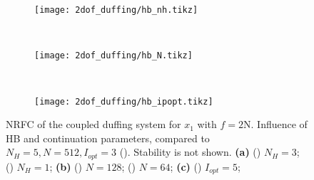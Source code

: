 \begin{figure}[ht!]
  \centering
  \begin{subfigure}[b]{0.7\textwidth}
    \texttt{[image: 2dof\_duffing/hb\_nh.tikz]}
    \caption{}
    \label{fig:hb_frf_a_appendix}
  \end{subfigure}\\
  \begin{subfigure}[b]{0.45\textwidth}
    \texttt{[image: 2dof\_duffing/hb\_N.tikz]}
    \caption{}
    \label{fig:hb_frf_b_appendix}
  \end{subfigure}~
  \begin{subfigure}[b]{0.45\textwidth}
    \texttt{[image: 2dof\_duffing/hb\_ipopt.tikz]}
    \caption{}
    \label{fig:hb_frf_c_appendix}
  \end{subfigure}
  \caption{NRFC of the coupled duffing system for $x_1$ with $f=2$N. Influence
    of HB and continuation parameters, compared to $N_H=5, N=512, I_{opt}=3$ (\sampleline{}).
    Stability is not shown.
    \textbf{(a)}
    () $N_H=3$;
    () $N_H=1$;
    \textbf{(b)}
    () $N=128$;
    () $N=64$;
    \textbf{(c)}
    () $I_{opt}=5$;}
  \label{fig:hb_frf_appendix}
\end{figure}





